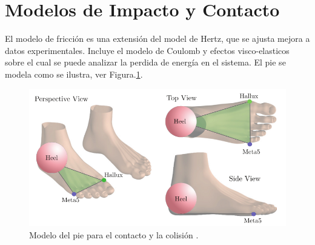 \documentclass[journal,letterpaper,twoside,twocolumn]{IEEEtran}
\begin{document}
\section{Modelos de Impacto y Contacto}
\label{sec:impYcon}
El modelo de fricción es una extensión del model de Hertz, que se ajusta mejora a datos experimentales\cite{Azad2010}. Incluye el modelo de Coulomb y efectos visco-elasticos sobre el cual se puede analizar la perdida de energía en el sistema. El pie se modela como se ilustra, ver Figura.\ref{fig:footModel}. 
\begin{figure}[!t]
  \centering
  \includegraphics[scale=0.3]{Felis2016aFeetModel.png}
  \caption{Modelo del pie para el contacto y la colisión \protect\cite{Felis2016a}.}
  \label{fig:footModel}
\end{figure}
\end{document}

